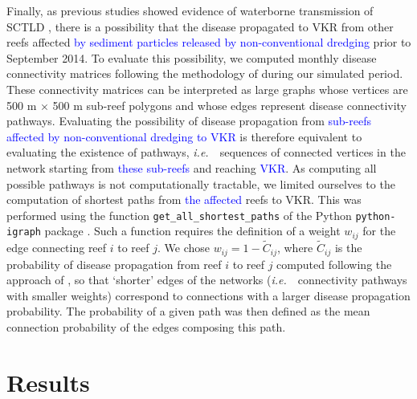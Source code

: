 \documentclass[preprint,12pt,authoryear]{elsarticle}
\newcommand{\ie}{{\it i.e.}\ }
\newcommand{\modif}[1]{\textcolor{blue}{#1}}
\begin{document}
Finally, as previous studies showed evidence of waterborne transmission of SCTLD \citep{aeby2019pathogenesis, dobbelaere2020coupled,eaton2021measuring, meiling2021variable}, there is a possibility that the disease propagated to VKR from other reefs affected \modif{by sediment particles released by non-conventional dredging} prior to September 2014. To evaluate this possibility, we computed monthly disease connectivity matrices following the methodology of \cite{dobbelaere2020coupled} during our simulated period. These connectivity matrices can be interpreted as large graphs whose vertices are 500 m $\times$ 500 m sub-reef polygons and whose edges represent disease connectivity pathways. Evaluating the possibility of disease propagation from \modif{sub-reefs affected by non-conventional dredging to VKR} is therefore equivalent to evaluating the existence of pathways, \ie~sequences of connected vertices in the network starting from \modif{these sub-reefs} and reaching \modif{VKR}. As computing all possible pathways is not computationally tractable, we limited ourselves to the computation of shortest paths from \modif{the affected} reefs to VKR. This was performed using the function \texttt{get\_all\_shortest\_paths} of the Python \texttt{python-igraph} package \citep{csardi2006igraph}. Such a function requires the definition of a weight $w_{ij}$ for the edge connecting reef $i$ to reef $j$. We chose $w_{ij} = 1-\tilde{C}_{ij}$, where $\tilde{C}_{ij}$ is the probability of disease propagation from reef $i$ to reef $j$ computed following the approach of \cite{dobbelaere2020coupled}, so that `shorter' edges of the networks (\ie~connectivity pathways with smaller weights) correspond to connections with a larger disease propagation probability. The probability of a given path was then defined as the mean connection probability of the edges composing this path.


\section{Results}
\end{document}
